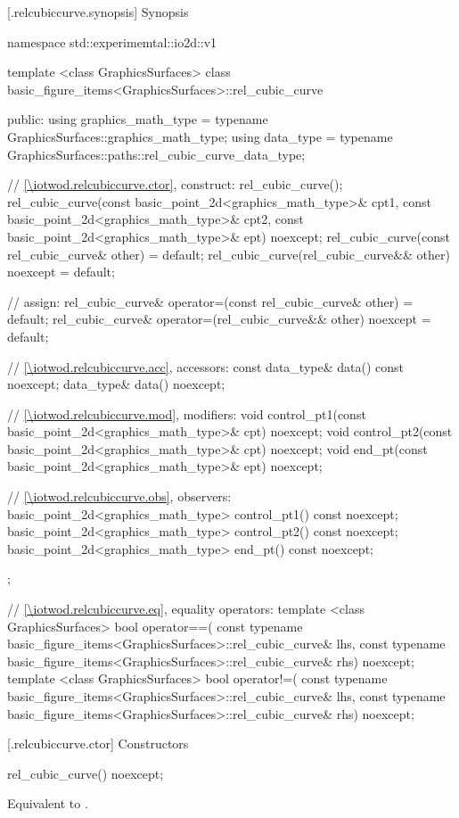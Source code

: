  [\iotwod.relcubiccurve.synopsis] {Synopsis}
\begin{codeblock}
namespace std::experimemtal::io2d::v1 {
  template <class GraphicsSurfaces>
  class basic_figure_items<GraphicsSurfaces>::rel_cubic_curve {
  public:
    using graphics_math_type = typename GraphicsSurfaces::graphics_math_type;
    using data_type =
      typename GraphicsSurfaces::paths::rel_cubic_curve_data_type;

    // \ref{\iotwod.relcubiccurve.ctor}, construct:
    rel_cubic_curve();
    rel_cubic_curve(const basic_point_2d<graphics_math_type>& cpt1,
       const basic_point_2d<graphics_math_type>& cpt2,
       const basic_point_2d<graphics_math_type>& ept) noexcept;
    rel_cubic_curve(const rel_cubic_curve& other) = default;
    rel_cubic_curve(rel_cubic_curve&& other) noexcept = default;

    // assign:
    rel_cubic_curve& operator=(const rel_cubic_curve& other) = default;
    rel_cubic_curve& operator=(rel_cubic_curve&& other) noexcept = default;

    // \ref{\iotwod.relcubiccurve.acc}, accessors:
    const data_type& data() const noexcept;
    data_type& data() noexcept;

    // \ref{\iotwod.relcubiccurve.mod}, modifiers:
    void control_pt1(const basic_point_2d<graphics_math_type>& cpt) noexcept;
    void control_pt2(const basic_point_2d<graphics_math_type>& cpt) noexcept;
    void end_pt(const basic_point_2d<graphics_math_type>& ept) noexcept;

    // \ref{\iotwod.relcubiccurve.obs}, observers:
    basic_point_2d<graphics_math_type> control_pt1() const noexcept;
    basic_point_2d<graphics_math_type> control_pt2() const noexcept;
    basic_point_2d<graphics_math_type> end_pt() const noexcept;
  };

  // \ref{\iotwod.relcubiccurve.eq}, equality operators:
  template <class GraphicsSurfaces>
  bool operator==(
    const typename basic_figure_items<GraphicsSurfaces>::rel_cubic_curve& lhs,
    const typename basic_figure_items<GraphicsSurfaces>::rel_cubic_curve& rhs) 
    noexcept;  
  template <class GraphicsSurfaces>
  bool operator!=(
    const typename basic_figure_items<GraphicsSurfaces>::rel_cubic_curve& lhs,
    const typename basic_figure_items<GraphicsSurfaces>::rel_cubic_curve& rhs) 
    noexcept;  
}
\end{codeblock}

 [\iotwod.relcubiccurve.ctor] {Constructors}%

%
\begin{itemdecl}
rel_cubic_curve() noexcept;
\end{itemdecl}
\begin{itemdescr}
\pnum
\effects
Equivalent to .
\end{itemdescr}


